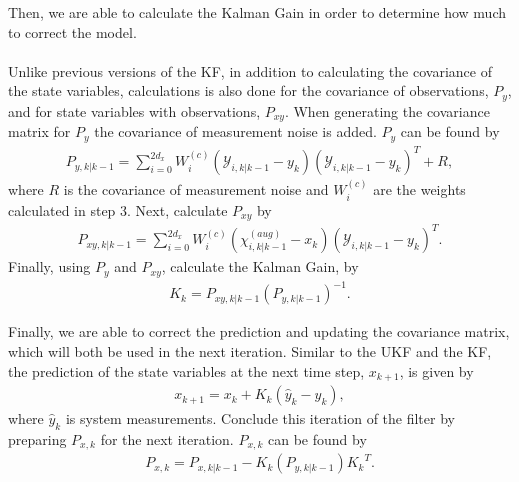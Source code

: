 \begin{enumerate}
              
       Then, we are able to calculate the Kalman Gain in order to determine how much to correct the model. \\ \\
       Unlike previous versions of the KF, in addition to calculating the covariance of the state variables, calculations is also done for the covariance of observations, $P_{y}$, and for state variables with observations, $P_{xy}$. When generating the covariance matrix for $P_{y}$ the covariance of measurement noise is added. $P_{y}$ can be found by
        \begin{align*}
       P_{y, k | k-1} = \sum^{2d_x}_{i = 0} W_i^{(c)} (\mathcal{Y}_{i, k | k - 1} -   y_{k} )(\mathcal{Y}_{i, k | k - 1} -  y_{k} )^T + R,
       \end{align*}
       where $R$ is the covariance of measurement noise and $W_i^{(c)} $ are the weights calculated in step 3. Next, calculate $P_{xy}$ by
        \begin{align*}
       P_{xy, k | k-1} = \sum^{2d_x}_{i = 0} W_i^{(c)} (\chi^{(aug)}_{i, k | k - 1} -   x_{k } )(\mathcal{Y}_{i, k | k - 1} -  y_{ k } )^T .
       \end{align*}
       Finally, using $P_{y}$ and $P_{xy}$, calculate the Kalman Gain, by
       \begin{align*}
       K_k = P_{xy, k | k-1} (P_{y, k | k-1}) ^{-1}.
       \end{align*}
        
        
        
      \noindent Finally, we are able to correct the prediction and updating the covariance matrix, which will both be used in the next iteration. Similar to the UKF and the KF, the prediction of the state variables at the next time step, $x_{k+1}$, is given by 
      \begin{align*}
        x_{k+1} = x_{k} + K_k(\hat y_k - y_{k}),
        \end{align*}
        where $\hat{y}_k$ is system measurements. Conclude this iteration of the filter by preparing $ P_{x, k} $ for the next iteration.  $P_{x, k} $ can be found by
       \begin{align*}
       P_{x, k} = P_{x, k|k-1} -K_k (P_{y, k | k-1} ) {K_k}^T.
       \end{align*}     
  
            
            

\end{enumerate}
